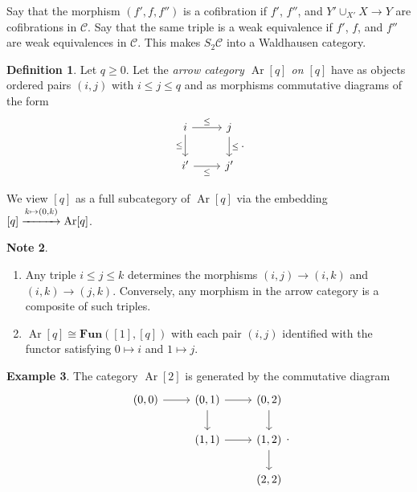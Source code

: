 \documentclass[10pt,letterpaper,cm]{nupset}
\theoremstyle{definition}
\newtheorem{definition}{Definition}
\newtheorem{exmp}[definition]{Example}
\newtheorem{note}[definition]{Note}
\theoremstyle{theorem}
\theoremstyle{remark}
\newcommand{\1}{\mathbf{1}}
\renewcommand{\c}{\mathscr{C}}
\newcommand{\0}{\vec 0}
\DeclareMathOperator{\Ar}{Ar}
\begin{document}
Say that the morphism $\left(f', f, f''\right)$ is a cofibration if $f'$, $f''$, and $Y' \cup_{X'} X \to Y$ are cofibrations in $\c$. Say that  the same triple is a weak equivalence if $f'$, $f$, and $f''$ are weak equivalences in $\c$. This makes $S_2 \c$ into a Waldhausen category.


\begin{definition}
Let $q\geq 0$. Let the \textit{arrow category $\Ar[q]$ on $\left[q\right]$} have as objects ordered pairs $\left(i, j\right)$ with $i\leq j \leq q$ and as morphisms commutative diagrams of the form
\[
\begin{tikzcd}
i \arrow[d, "\leq"'] \arrow[r, "\leq"] & j \arrow[d, "\leq"] \\
i' \arrow[r, "\leq"'] & j'
\end{tikzcd}.
\] 
\end{definition}

We view $\left[q\right]$ as a full subcategory of $\Ar[q]$ via the embedding $\left[q\right] \overset{k \mapsto \left(0, k\right)}{\xrightarrow{\hspace*{1cm}}} \Ar[q]$.

\begin{note} $ $
\begin{enumerate}
\item Any triple $i\leq j \leq k$ determines the morphisms $\left(i, j\right) \to \left(i, k\right)$ and $\left(i, k\right) \to \left(j, k\right)$. Conversely, any morphism in the arrow category is a composite of such triples.
\item $\Ar[q] \cong \mathbf{Fun}([1], [q])$ with each pair $\left(i, j\right)$ identified with the functor satisfying $0 \mapsto i$ and $1 \mapsto j$.
\end{enumerate}
\end{note}

\begin{exmp}
The category $\Ar[2]$ is generated by the commutative diagram
\[
\begin{tikzcd}
{\left(0, 0\right)} \arrow[r] & {\left(0,1\right)} \arrow[r] \arrow[d] & {\left(0,2\right)} \arrow[d] \\
 & {\left(1, 1\right)} \arrow[r] & {\left(1,2\right)} \arrow[d] \\
 &  & {\left(2,2\right)}
\end{tikzcd} .
\]
\end{exmp}

\smallskip
\end{document}
